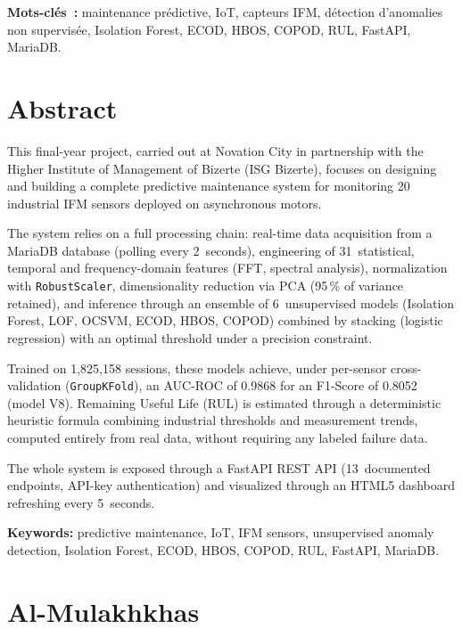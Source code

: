 \documentclass[12pt,a4paper]{report}
\begin{document}
\vspace{0.5cm}
\noindent\textbf{Mots-clés~:} maintenance prédictive, IoT, capteurs IFM, détection
d'anomalies non supervisée, Isolation Forest, ECOD, HBOS, COPOD, RUL, FastAPI, MariaDB.

\clearpage
\chapter*{Abstract}
\thispagestyle{plain}

This final-year project, carried out at Novation City in partnership with the
Higher Institute of Management of Bizerte (ISG Bizerte), focuses on designing and
building a complete predictive maintenance system for monitoring 20 industrial IFM
sensors deployed on asynchronous motors.

The system relies on a full processing chain: real-time data acquisition from a
MariaDB database (polling every 2~seconds), engineering of 31~statistical, temporal
and frequency-domain features (FFT, spectral analysis), normalization with
\texttt{RobustScaler}, dimensionality reduction via PCA (95\,\% of variance retained),
and inference through an ensemble of 6~unsupervised models (Isolation Forest, LOF,
OCSVM, ECOD, HBOS, COPOD) combined by stacking (logistic regression) with an
optimal threshold under a precision constraint.

Trained on 1,825,158 sessions, these models achieve, under per-sensor cross-validation
(\texttt{GroupKFold}), an AUC-ROC of 0.9868 for an F1-Score of 0.8052 (model V8).
Remaining Useful Life (RUL) is estimated through a deterministic heuristic formula
combining industrial thresholds and measurement trends, computed entirely from real
data, without requiring any labeled failure data.

The whole system is exposed through a FastAPI REST API (13~documented endpoints,
API-key authentication) and visualized through an HTML5 dashboard refreshing every
5~seconds.

\vspace{0.5cm}
\noindent\textbf{Keywords:} predictive maintenance, IoT, IFM sensors, unsupervised
anomaly detection, Isolation Forest, ECOD, HBOS, COPOD, RUL, FastAPI, MariaDB.

\clearpage


\chapter*{Al-Mulakhkhas}
\thispagestyle{plain}
\end{document}
